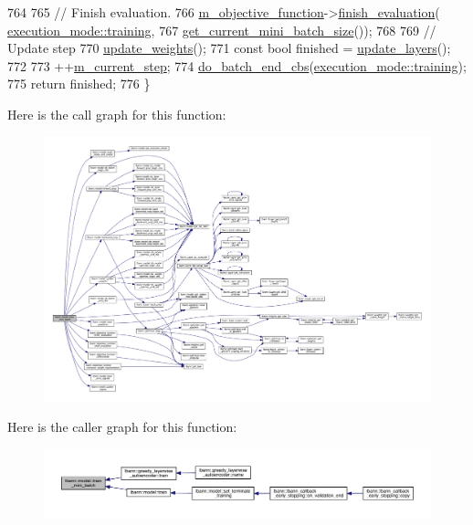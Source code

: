 \begin{DoxyCode}
764 
765   \textcolor{comment}{// Finish evaluation.}
766   \hyperlink{classlbann_1_1model_a24c50e7108dd7698671aed7df5b22e8b}{m\_objective\_function}->\hyperlink{classlbann_1_1objective__function_ad35ce9b7daa87d197d00b1762b691a02}{finish\_evaluation}(
      \hyperlink{base_8hpp_a2781a159088df64ed7d47cc91c4dc0a8ac185ddac8b5a8f5aa23c5b80bc12d214}{execution\_mode::training},
767                                           \hyperlink{classlbann_1_1model_a3eaad8fd538b99ecab9afca6dc3327fd}{get\_current\_mini\_batch\_size}());
768 
769   \textcolor{comment}{// Update step}
770   \hyperlink{classlbann_1_1model_a38d8924938fa69857d3f9ed83ac98ee9}{update\_weights}();
771   \textcolor{keyword}{const} \textcolor{keywordtype}{bool} finished = \hyperlink{classlbann_1_1model_a7518775e0fd29ed682319193e2d264cc}{update\_layers}();
772 
773   ++\hyperlink{classlbann_1_1model_af31a76afc53061747d2170a65e98f692}{m\_current\_step};
774   \hyperlink{classlbann_1_1model_a3dc29e9751a53afda7e171aff335273e}{do\_batch\_end\_cbs}(\hyperlink{base_8hpp_a2781a159088df64ed7d47cc91c4dc0a8ac185ddac8b5a8f5aa23c5b80bc12d214}{execution\_mode::training});
775   \textcolor{keywordflow}{return} finished;
776 \}
\end{DoxyCode}
Here is the call graph for this function\+:\nopagebreak
\begin{figure}[H]
\begin{center}
\leavevmode
\includegraphics[width=350pt]{classlbann_1_1model_a462105993a63277a1ead39c30ebae1bb_cgraph}
\end{center}
\end{figure}
Here is the caller graph for this function\+:\nopagebreak
\begin{figure}[H]
\begin{center}
\leavevmode
\includegraphics[width=350pt]{classlbann_1_1model_a462105993a63277a1ead39c30ebae1bb_icgraph}
\end{center}
\end{figure}
\mbox{\label{classlbann_1_1model_a7518775e0fd29ed682319193e2d264cc}} 
